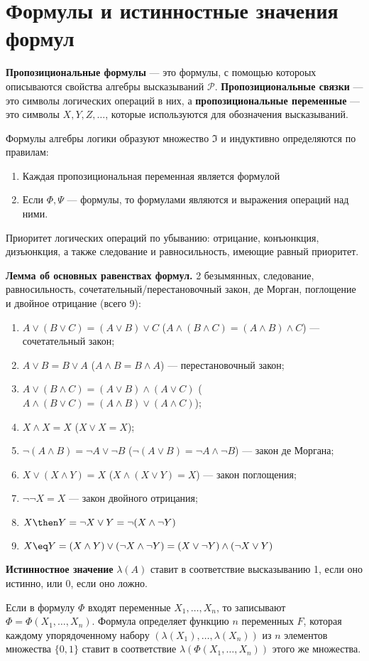 \section{Формулы и истинностные значения формул}
\dftion \textbf{Пропозициональные формулы} --- это формулы, с помощью котороых описываются свойства алгебры высказываний $\mathscr{P}$. \textbf{Пропозициональные связки} --- это символы логических операций в них, а \textbf{пропозициональные переменные} --- это символы $X, Y, Z, \dots$, которые используются для обозначения высказываний.

\dftion Формулы алгебры логики образуют множество $\mathfrak I$ и индуктивно определяются по правилам:
\begin{enumerate}
    \item Каждая пропозициональная переменная является формулой
    \item Если $\Phi, \Psi$ --- формулы, то формулами являются и выражения операций над ними.
\end{enumerate}

\dftion Приоритет логических операций по убыванию: отрицание, конъюнкция, дизъюнкция, а также следование и равносильность, имеющие равный приоритет.

\textbf{Лемма об основных равенствах формул.} \label{q2:lemma}
2 безымянных, следование, равносильность, сочетательный/перестановочный закон, де Морган, поглощение и двойное отрицание (всего 9):
\begin{enumerate}
    \item $A \lor (B \lor C) = (A \lor B) \lor C$ \Big($A \land (B \land C) = (A \land B) \land C$\Big) --- сочетательный закон;
    \item $A \lor B = B \lor A$ \Big($A \land B = B \land A$\Big) --- перестановочный закон;
    \item $A \lor (B \land C) = (A \lor B) \land (A \lor C)$ \Big($A \land (B \lor C) = (A \land B) \lor (A \land C)$\Big);
    \item $X \land X = X$ \Big($X \lor X = X$\Big);
    \item $\lnot(A \land B) = \lnot A \lor \lnot B$ \Big($\lnot(A \lor B) = \lnot A \land \lnot B$\Big) --- закон де Моргана;
    \item $X \lor (X \land Y) = X$ \Big($X \land (X \lor Y) = X$\Big) --- закон поглощения;
    \item $\lnot \lnot X = X$ --- закон двойного отрицания;
    \item $X \then Y = \lnot X \lor Y = \lnot (X \land \lnot Y)$
    \item $X \eq Y = (X \land Y) \lor (\lnot X \land \lnot Y) = (X \lor \lnot Y) \land (\lnot X \lor Y)$
\end{enumerate}

\dftion \textbf{Истинностное значение} $\lambda(A)$ ставит в соответствие высказыванию 1, если оно истинно, или 0, если оно ложно.

\dftion Если в формулу $\Phi$ входят переменные $X_1, \dots, X_n$, то записывают $\Phi = \Phi(X_1, \dots, X_n)$. Формула определяет функцию $n$ переменных $F$, которая каждому упорядоченному набору $(\lambda(X_1), \dots, \lambda(X_n))$ из $n$ элементов множества $\{0, 1\}$ ставит в соответствие $\lambda(\Phi(X_1, \dots, X_n))$ этого же множества.
